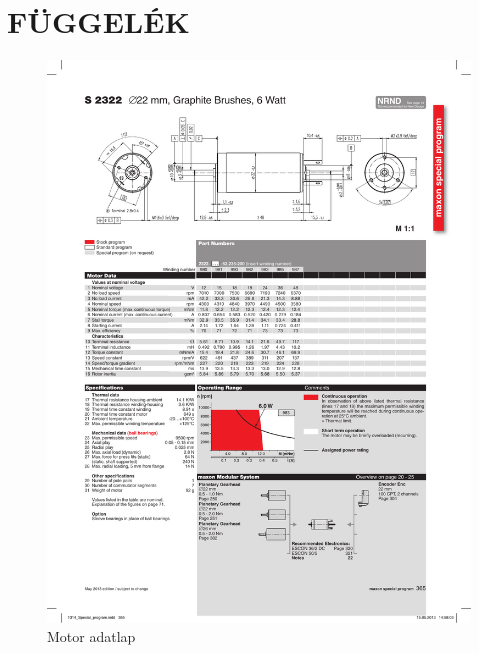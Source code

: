 \part*{FÜGGELÉK}

\begin{figure}[H]
    \begin{center}
    \includegraphics[width=\textwidth]{images/motor.pdf}
    \caption{Motor adatlap}\label{fig:motor_datasheet}
    \end{center}
\end{figure}

